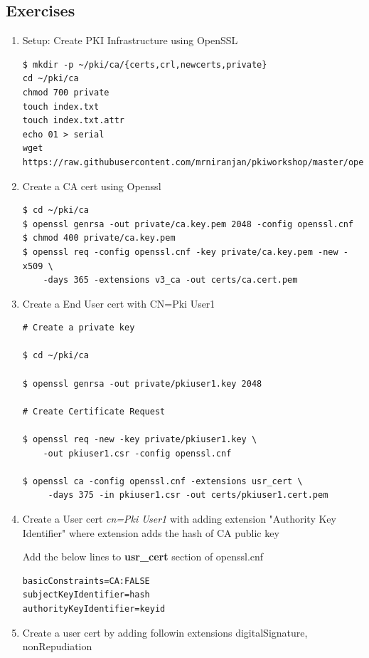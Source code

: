\documentclass[a4paper]{article}
\begin{document}
    \subsection{Exercises}
\begin{enumerate}[label*=\arabic*.]
    \item Setup: Create PKI Infrastructure using OpenSSL
        \begin{lstlisting}[style=BashInputStyle]
$ mkdir -p ~/pki/ca/{certs,crl,newcerts,private}
cd ~/pki/ca
chmod 700 private
touch index.txt
touch index.txt.attr
echo 01 > serial
wget https://raw.githubusercontent.com/mrniranjan/pkiworkshop/master/openssl.cnf
        \end{lstlisting}
    \item Create a CA cert using Openssl
        \begin{lstlisting}[style=BashInputStyle]
$ cd ~/pki/ca
$ openssl genrsa -out private/ca.key.pem 2048 -config openssl.cnf
$ chmod 400 private/ca.key.pem
$ openssl req -config openssl.cnf -key private/ca.key.pem -new -x509 \
    -days 365 -extensions v3_ca -out certs/ca.cert.pem
        \end{lstlisting}
    \item Create a End User cert with CN=Pki User1
        \begin{lstlisting}[style=BashInputStyle]
# Create a private key
        
$ cd ~/pki/ca
        
$ openssl genrsa -out private/pkiuser1.key 2048
        
# Create Certificate Request

$ openssl req -new -key private/pkiuser1.key \
    -out pkiuser1.csr -config openssl.cnf
        
$ openssl ca -config openssl.cnf -extensions usr_cert \
     -days 375 -in pkiuser1.csr -out certs/pkiuser1.cert.pem
        \end{lstlisting}
    \item Create a User cert \textit{cn=Pki User1} with adding extension "Authority Key Identifier" where 
        extension adds the hash of CA public key

        Add the below lines to \textbf{usr\_cert} section of openssl.cnf
        \begin{lstlisting}
basicConstraints=CA:FALSE
subjectKeyIdentifier=hash
authorityKeyIdentifier=keyid
        \end{lstlisting}
    \item Create a user cert by adding followin extensions digitalSignature, nonRepudiation


\end{enumerate}
\end{document}
